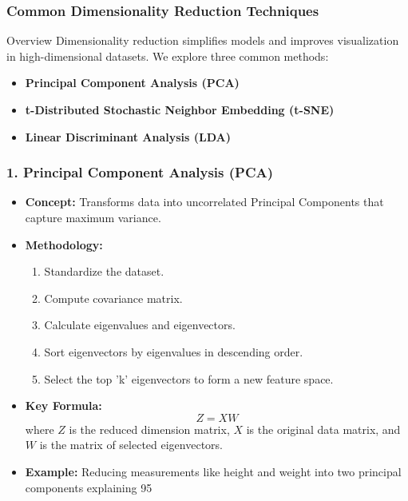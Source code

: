 \documentclass[aspectratio=169]{beamer}
\begin{document}
\begin{frame}[fragile]
    \frametitle{Common Dimensionality Reduction Techniques}
    \begin{block}{Overview}
        Dimensionality reduction simplifies models and improves visualization in high-dimensional datasets. We explore three common methods: 
        \begin{itemize}
            \item \textbf{Principal Component Analysis (PCA)}
            \item \textbf{t-Distributed Stochastic Neighbor Embedding (t-SNE)}
            \item \textbf{Linear Discriminant Analysis (LDA)}
        \end{itemize}
    \end{block}
\end{frame}

\begin{frame}[fragile]
    \frametitle{1. Principal Component Analysis (PCA)}
    \begin{itemize}
        \item \textbf{Concept:} Transforms data into uncorrelated Principal Components that capture maximum variance.
        \item \textbf{Methodology:}
            \begin{enumerate}
                \item Standardize the dataset.
                \item Compute covariance matrix.
                \item Calculate eigenvalues and eigenvectors.
                \item Sort eigenvectors by eigenvalues in descending order.
                \item Select the top 'k' eigenvectors to form a new feature space.
            \end{enumerate}
        \item \textbf{Key Formula:}
        \begin{equation}
            Z = XW
        \end{equation}
        where \(Z\) is the reduced dimension matrix, \(X\) is the original data matrix, and \(W\) is the matrix of selected eigenvectors.
        \item \textbf{Example:} Reducing measurements like height and weight into two principal components explaining 95%
    \end{itemize}
\end{frame}
\end{document}
